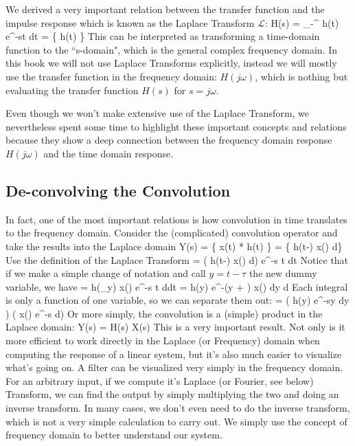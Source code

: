  We derived a very important relation between the transfer function and the impulse response which is known as the Laplace Transform $\mathcal{L}$:
\be
	H(s) = \int_{-\infty}^{\infty} h(t) e^{-st} dt =  \left\{ h(t) \right\}
\ee
This can be interpreted as transforming a time-domain function to the ``s-domain", which is the general complex frequency domain.  In this book we will not use Laplace Transforms explicitly, instead we will mostly use the transfer function in the frequency domain:  $H(j\omega)$, which is nothing but evaluating the transfer function $H(s)$ for $s=j\omega$.  

Even though we won't make extensive use of the Laplace Transform, we nevertheless spent some time to highlight these important concepts and relations because they show a deep connection between the frequency domain response $H(j\omega)$ and the time domain response.

 




\subsection{De-convolving the Convolution}


In fact, one of the most important relations is how convolution in time translates to the frequency domain.   Consider the (complicated) convolution operator and take the results into the Laplace domain
\be
	Y(s) =  \left\{ x(t) * h(t) \right\} =  \left\{  \int h(t-\tau) x(\tau) d\tau \right\} 
\ee
Use the definition of the Laplace Transform
\be
	= \int \left( \int h(t-\tau) x(\tau) d\tau \right) e^{-s t} dt
\ee
Notice that if we make a simple change of notation and call $y = t-\tau$ the new dummy variable, we have
\be
	= \int  \int h(_{y}) x(\tau)  e^{-s t}  d\tau dt =  \int  \int h(y) e^{-(y + \tau)} x(\tau) dy d\tau
\ee
Each integral is only a function of one variable, so we can separate them out:
\be
	= \left( \int h(y) e^{-sy} dy  \right) \left( \int x(\tau) e^{-s \tau} d\tau \right) 
\ee
 Or more simply, the convolution is a (simple) product in the Laplace domain:
\be
	Y(s) = H(s) X(s) 
\ee
This is a very important result.  Not only is it more efficient to work directly in the Laplace (or Frequency) domain when computing the response of a linear system, but it's also much easier to visualize what's going on.  A filter can be visualized very simply in the frequency domain. For an arbitrary input, if we compute it's Laplace (or Fourier, see below) Transform, we can find the output by simply multiplying the two and doing an inverse transform.  In many cases, we don't even need to do the inverse transform, which is not a very simple calculation to carry out.  We simply use the concept of frequency domain to better understand our system.

